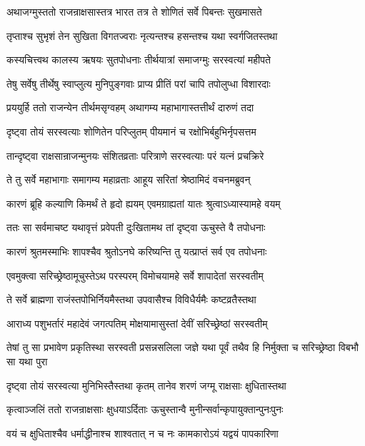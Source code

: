 \twolineshloka
{अथाजग्मुस्ततो राजन्राक्षसास्तत्र भारत}
{तत्र ते शोणितं सर्वे पिबन्तः सुखमासते}


\twolineshloka
{तृप्ताश्च सुभृशं तेन सुखिता विगतज्वराः}
{नृत्यन्तश्च हसन्तश्च यथा स्वर्गजितस्तथा}


\twolineshloka
{कस्यचित्त्वथ कालस्य ऋषयः सुतपोधनाः}
{तीर्थयात्रां समाजग्मुः सरस्वत्यां महीपते}


\twolineshloka
{तेषु सर्वेषु तीर्थेषु स्वाप्लुत्य मुनिपुङ्गवाः}
{प्राप्य प्रीतिं परां चापि तपोलुप्धा विशारदाः}


\twolineshloka
{प्रययुर्हि ततो राजन्येन तीर्थमसृग्वहम्}
{अथागम्य महाभागास्तत्तीर्थं दारुणं तदा}


\twolineshloka
{दृष्ट्वा तोयं सरस्वत्याः शोणितेन परिप्लुतम्}
{पीयमानं च रक्षोभिर्बहुभिर्नृपसत्तम}


\twolineshloka
{तान्दृष्ट्वा राक्षसान्राजन्मुनयः संशितव्रताः}
{परित्राणे सरस्वत्याः परं यत्नं प्रचक्रिरे}


\twolineshloka
{ते तु सर्वे महाभागाः समागम्य महाव्रताः}
{आहूय सरितां श्रेष्ठामिदं वचनमब्रुवन्}


\twolineshloka
{कारणं ब्रूहि कल्याणि किमर्थं ते हृदो ह्ययम्}
{एवमग्राह्यतां यातः श्रुत्वाऽध्यास्यामहे वयम्}


\twolineshloka
{ततः सा सर्वमाचष्ट यथावृत्तं प्रवेपती}
{दुःखितामथ तां दृष्ट्वा ऊचुस्ते वै तपोधनाः}


\twolineshloka
{कारणं श्रुतमस्माभिः शापश्चैव श्रुतोऽनघे}
{करिष्यन्ति तु यत्प्राप्तं सर्व एव तपोधनाः}


\twolineshloka
{एवमुक्त्वा सरिच्छ्रेष्ठामूचुस्तेऽथ परस्परम्}
{विमोचयामहे सर्वे शापादेतां सरस्वतीम्}


\twolineshloka
{ते सर्वे ब्राह्मणा राजंस्तपोभिर्नियमैस्तथा}
{उपवासैश्च विविधैर्यमैः कष्टव्रतैस्तथा}


\twolineshloka
{आराध्य पशुभर्तारं महादेवं जगत्पतिम्}
{मोक्षयामासुस्तां देवीं सरिच्छ्रेष्ठां सरस्वतीम्}


\threelineshloka
{तेषां तु सा प्रभावेण प्रकृतिस्था सरस्वती}
{प्रसन्नसलिला जज्ञे यथा पूर्वं तथैव हि}
{निर्मुक्ता च सरिच्छ्रेष्ठा विबभौ सा यथा पुरा}


\twolineshloka
{दृष्ट्वा तोयं सरस्वत्या मुनिभिस्तैस्तथा कृतम्}
{तानेव शरणं जग्मू राक्षसाः क्षुधितास्तथा}


\twolineshloka
{कृत्वाञ्जलिं ततो राजन्राक्षसाः क्षुधयाऽर्दिताः}
{ऊचुस्तान्वै मुनीन्सर्वान्कृपायुक्तान्पुनःपुनः}


\twolineshloka
{वयं च क्षुधिताश्चैव धर्माद्धीनाश्च शाश्वतात्}
{न च नः कामकारोऽयं यद्वयं पापकारिणा}


